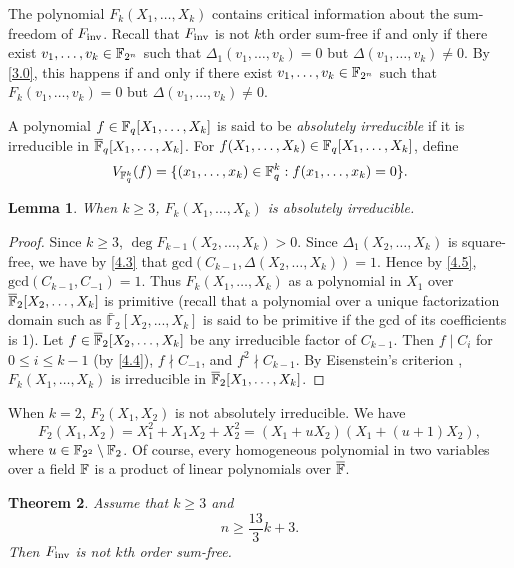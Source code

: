 \documentclass{amsart}
\newtheorem{thm}{Theorem}[section]
\newtheorem{lem}[thm]{Lemma}
\numberwithin{equation}{section}
\theoremstyle{definition}
\newcommand{\f}{\Bbb F}
\newcommand{\fin}{F_{\text{\rm inv}}}
\newcommand{\fbar}{\overline{\f}}
\begin{document}
The polynomial $F_k(X_1,\dots,X_k)$ contains critical information about the sum-freedom of $\fin$. Recall that $\fin$ is not $k$th order sum-free if and only if there exist $v_1,\dots,v_k\in\f_{2^n}$ such that $\Delta_1(v_1,\dots,v_k)=0$ but $\Delta(v_1,\dots,v_k)\ne 0$. By \eqref{3.0}, this happens if and only if there exist $v_1,\dots,v_k\in\f_{2^n}$ such that $F_k(v_1,\dots,v_k)=0$ but $\Delta(v_1,\dots,v_k)\ne 0$.

A polynomial $f\in\f_q[X_1,\dots,X_k]$ is said to be {\em absolutely irreducible} if it is irreducible in $\fbar_q[X_1,\dots,X_k]$. For $f(X_1,\dots,X_k)\in\f_q[X_1,\dots,X_k]$, define
\[
V_{\f_q^k}(f)=\{(x_1,\dots,x_k)\in\f_q^k:f(x_1,\dots,x_k)=0\}.
\]


\begin{lem}\label{T3.1}
When $k\ge 3$, $F_k(X_1,\dots,X_k)$ is absolutely irreducible.
\end{lem}

\begin{proof}
Since $k\ge 3$, $\deg F_{k-1}(X_2,\dots,X_k)>0$. Since $\Delta_1(X_2,\dots,X_k)$ is square-free, we have by \eqref{4.3} that $\text{gcd}(C_{k-1},\Delta(X_2,\dots,X_k))=1$. Hence by \eqref{4.5},\break 
$\text{gcd}(C_{k-1},C_{-1})=1$. Thus $F_k(X_1,\dots,X_k)$ as a polynomial in $X_1$ over $\fbar_2[X_2,\dots,X_k]$ is primitive (recall that a polynomial over a unique factorization domain such as $\bar {\mathbb F}_2[X_2,...,X_k]$ is said to be primitive if the gcd of its coefficients is 1). Let $f\in\fbar_2[X_2,\dots,X_k]$ be any irreducible factor of $C_{k-1}$. Then $f\mid C_i$ for $0\le i\le k-1$ (by \eqref{4.4}), $f\nmid C_{-1}$, and $f^2\nmid C_{k-1}$. By Eisenstein's criterion \cite[Chapter III, Theorem~6.15]{Hungerford-1980}, $F_k(X_1,\dots,X_k)$ is irreducible in $\fbar_2[X_1,\dots,X_k]$.
\end{proof}

\medskip
{} When $k=2$, $F_2(X_1,X_2)$ is not absolutely irreducible. We have
\[
F_2(X_1,X_2)=X_1^2+X_1X_2+X_2^2=(X_1+uX_2)(X_1+(u+1)X_2),
\]
where $u\in\f_{2^2}\setminus\f_2$. Of course, every homogeneous polynomial in two variables over a field $\f$ is a product of linear polynomials over $\fbar$.

\begin{thm}\label{T3.4}
Assume that $k\ge 3$ and
\begin{equation}\label{3.5}
n\ge\frac{13}3k+3.
\end{equation}
Then $\fin$ is not $k$th order sum-free.
\end{thm}
\end{document}
